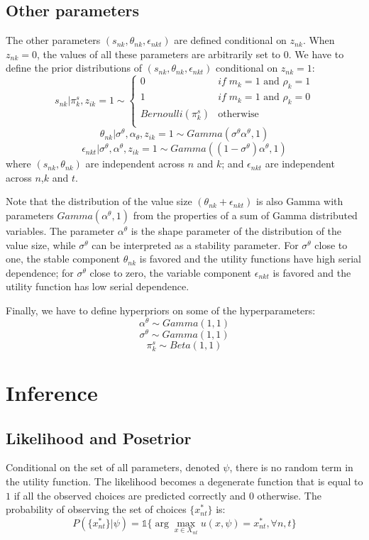 \documentclass[12pt]{article}
\begin{document}
\subsection{Other parameters}

The other parameters $(s_{nk},\theta_{nk},\epsilon_{nkt})$ are defined conditional on $z_{nk}$. When $z_{nk}=0$, the values of all these parameters are arbitrarily set to $0$. We have to define the prior distributions of $(s_{nk},\theta_{nk},\epsilon_{nkt})$ conditional on $z_{nk}=1$:
$$ s_{nk}|\pi_k^s,z_{ik}=1 \sim \left\{ \begin{array}{cl}
0 & if \; m_k=1 \text{ and } \rho_k=1\\
1 & if \; m_k=1 \text{ and } \rho_k=0\\
Bernoulli(\pi_k^s) & \text{otherwise}\\
\end{array}\right.$$
$$ \theta_{nk}|\sigma^\theta,\alpha_\theta,z_{ik}=1 \sim Gamma(\sigma^\theta \alpha^\theta,1) $$
$$ \epsilon_{nkt}|\sigma^\theta,\alpha^\theta,z_{ik}=1 \sim Gamma((1-\sigma^\theta)\alpha^\theta,1) $$
where $(s_{nk},\theta_{nk})$ are independent across $n$ and $k$; and $\epsilon_{nkt}$ are independent across $n$,$k$ and $t$.

Note that the distribution of the value size $(\theta_{nk} + \epsilon_{nkt})$ is also Gamma with parameters $Gamma(\alpha^\theta,1)$ from the properties of a sum of Gamma distributed variables. The parameter $\alpha^\theta$ is the shape parameter of the distribution of the value size, while $\sigma^\theta$ can be interpreted as a stability parameter. 
For $\sigma^\theta$ close to one, the stable component $\theta_{nk}$ is favored and the utility functions have high serial dependence; for $\sigma^\theta$ close to zero, the variable component $\epsilon_{nkt}$ is favored and the utility function has low serial dependence.

Finally, we have to define hyperpriors on some of the hyperparameters:
$$\alpha^\theta \sim Gamma(1,1)$$
$$\sigma^\theta \sim Gamma(1,1)$$
$$ \pi_k^s \sim Beta(1,1) $$


\section{Inference}

\subsection{Likelihood and Posetrior} \label{sec:likelihood}
Conditional on the set of all parameters, denoted $\psi$, there is no random term in the utility function. The likelihood becomes a degenerate function that is equal to $1$ if all the observed choices are predicted correctly and $0$ otherwise. The probability of observing the set of choices $\{x_{nt}^*\}$ is: 
$$P(\{x_{nt}^*\}|\psi) = \mathds{1}\{ \arg \max\limits_{x\in X_{nt}} u(x,\psi) = x_{nt}^*, \forall n,t \}$$
\end{document}
